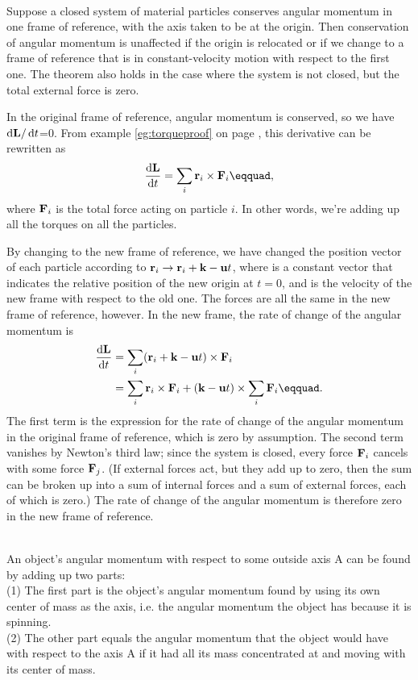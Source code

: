 \noindent{}\\
 Suppose a closed system of material particles conserves
angular momentum in one frame of reference, with the axis taken to be
at the origin. Then conservation of angular momentum is unaffected if the origin
is relocated or if we change to a frame of reference that is in constant-velocity
motion with respect to the first one. The theorem also holds in the case where the system is not
closed, but the total external force is zero.\label{choiceofaxisproof}

 In the original frame of reference, angular momentum is
conserved, so we have $\operatorname{d\!}\textbf{L}/\operatorname{d\!} t$=0.
From example \ref{eg:torqueproof} on page \pageref{eg:torqueproof}, this
derivative can be rewritten as
\begin{equation*}
		\frac{\der\zb{L}}{\der t}	= \sum_i  \zb{r}_i\times\zb{F}_i\eqquad,
\end{equation*}
where $\textbf{F}_i$ is the total force acting on particle $i$. In other words, we're
adding up all the torques on all the particles. 

By changing to the new frame of reference, we have changed
the position vector of each particle according to $\textbf{r}_i \rightarrow \textbf{r}_i+\textbf{k}-\textbf{u}t$,
where  is a constant vector that indicates the relative position of the new
origin at $t=0$, and  is the velocity of the new frame with respect to the old one.
The forces are all the same in the new frame of reference, however.
In the new frame, the rate of change of the angular momentum is
\begin{align*}
		\frac{\der\zb{L}}{\der t}	&= \sum_i
				(\zb{r}_i+\zb{k}-\zb{u}t)\times\zb{F}_i \\
		&= \sum_i \zb{r}_i\times\zb{F}_i
			+ (\zb{k}-\zb{u}t) \times \sum_i \zb{F}_i\eqquad.
\end{align*}
The first term is the expression for the rate of change of the angular
momentum in the original frame of reference, which is zero by
assumption. The second term vanishes by Newton's third law; since the system is
closed, every force $\textbf{F}_i$ cancels with some force $\textbf{F}_j$.
(If external forces act, but they add up to zero, then the sum can be
broken up into a sum of internal forces and a sum of external forces, each of
which is zero.)
The rate of change of the angular momentum is therefore zero
in the new frame of reference.

\noindent{}\\
 An object's angular momentum
with respect to some outside axis A can be found by adding up
two parts:\\
(1) The first part is the object's angular momentum found by using
its own center of mass as the axis, i.e. the angular momentum the object
has because it is spinning.\\
(2) The other part equals the angular momentum that the object
would have with respect to the axis A if it had all its mass
concentrated at and moving with its center of mass.

